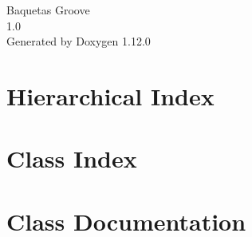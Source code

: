 \documentclass[twoside]{book}
\newcommand{\+}{\discretionary{\mbox{\scriptsize$\hookleftarrow$}}{}{}}
\newcommand{\clearemptydoublepage}{%
    \newpage{\pagestyle{empty}\cleardoublepage}%
  }
\begin{document}
  \raggedbottom
    \hypersetup{pageanchor=false,
                bookmarksnumbered=true,
                pdfencoding=unicode
               }
  \begin{titlepage}
  \vspace*{7cm}
  \begin{center}%
  {\Large Baqueta\textquotesingle{}s Groove}\\
  [1ex]\large 1.\+0 \\
  \vspace*{1cm}
  {\large Generated by Doxygen 1.12.0}\\
  \end{center}
  \end{titlepage}
  \clearemptydoublepage
  \tableofcontents
  \clearemptydoublepage
  \hypersetup{pageanchor=true}
\chapter{Hierarchical Index}

\chapter{Class Index}

\chapter{Class Documentation}






























  \backmatter
  \newpage
  \clearemptydoublepage
  \printindex
\end{document}
